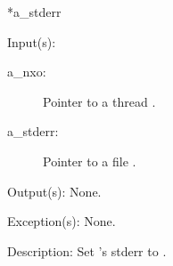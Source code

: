 \begin{capi}
{{ *a\_stderr}}
	\begin{capilist}
	\item[Input(s): ]
		\begin{description}\item[]
		\item[a\_nxo: ]
			Pointer to a thread .
		\item[a\_stderr: ]
			Pointer to a file .
		\end{description}
	\item[Output(s): ] None.
	\item[Exception(s): ] None.
	\item[Description: ]
		Set 's stderr to .
	\end{capilist}
\end{capi}

